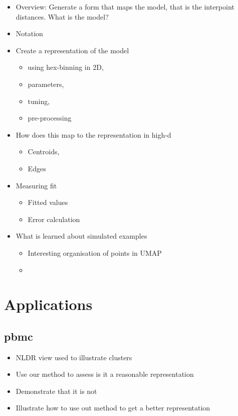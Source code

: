 \documentclass[
  12pt]{article}
\providecommand{\tightlist}{%
  \setlength{\itemsep}{0pt}\setlength{\parskip}{0pt}}\usepackage{longtable,booktabs,array}
\def\tightlist{}
\begin{document}
\begin{itemize}
\tightlist
\item
  Overview: Generate a form that maps the model, that is the interpoint
  distances. What is the model?
\item
  Notation
\item
  Create a representation of the model

  \begin{itemize}
  \tightlist
  \item
    using hex-binning in 2D,
  \item
    parameters,
  \item
    tuning,
  \item
    pre-processing
  \end{itemize}
\item
  How does this map to the representation in high-d

  \begin{itemize}
  \tightlist
  \item
    Centroids,
  \item
    Edges
  \end{itemize}
\item
  Measuring fit

  \begin{itemize}
  \tightlist
  \item
    Fitted values
  \item
    Error calculation
  \end{itemize}
\item
  What is learned about simulated examples

  \begin{itemize}
  \tightlist
  \item
    Interesting organisation of points in UMAP
  \item
  \end{itemize}
\end{itemize}

\section{Applications}\label{sec-applications}

\subsection{pbmc}\label{pbmc}

\begin{itemize}
\tightlist
\item
  NLDR view used to illustrate clusters
\item
  Use our method to assess is it a reasonable representation
\item
  Demonstrate that it is not
\item
  Illustrate how to use out method to get a better representation
\end{itemize}
\end{document}
